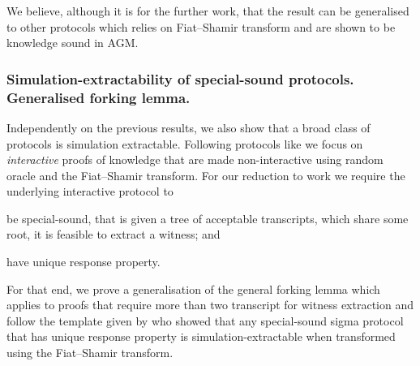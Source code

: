 \documentclass[runningheads,10pt]{llncs}
\begin{document}
    We believe, although it is for the further work, that the result can be generalised to other protocols which relies on Fiat--Shamir transform and are shown to be knowledge sound in AGM.


    \subsubsection*{Simulation-extractability of special-sound protocols. Generalised forking lemma.}
    Independently on the previous results, we also show that a broad class of protocols is simulation extractable.
    Following protocols like \cite{EPRINT:GabWilCio19,CCS:MBKM19,EC:CHMMVW20} we focus on \emph{interactive} proofs of knowledge that are made non-interactive using random oracle and the Fiat--Shamir transform. For our reduction to work we require the underlying interactive protocol to
    \begin{compactenum}
        \item be special-sound, that is given a tree of acceptable transcripts, which share some root, it is feasible to extract a witness; and
        \item have unique response property.
    \end{compactenum}
    For that end, we prove a generalisation of the general forking lemma which applies to proofs that require more than two transcript for witness extraction and follow the template given by \cite{INDOCRYPT:FKMV12} who showed that any special-sound sigma protocol that has unique response property is simulation-extractable when transformed using the Fiat--Shamir transform.

    
    
\end{document}
